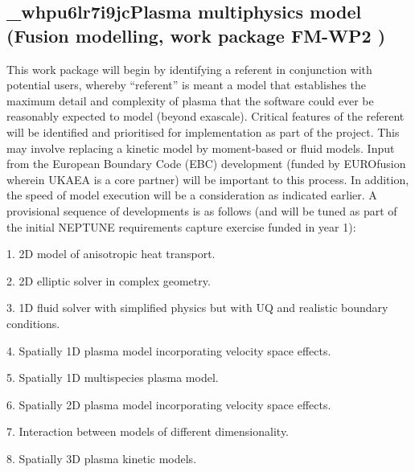 \documentclass{article}
\begin{document}
\vspace{14pt}
\subsection*{{\color{color25} \textbf{\_whpu6lr7i9jcPlasma multiphysics model}}{\color{color25}  
\label{HHlk22033533}(Fusion modelling, work package }{\color{color25} \textbf{FM-WP2}}{\color{color25} )\label{HHlk22044193}}}

\vspace{14pt}
This work package will begin by identifying a referent in conjunction with potential 
users, whereby ``referent'' is meant a model that establishes the maximum detail 
and complexity of plasma that the software could ever be reasonably expected to 
model (beyond exascale).  Critical features of the referent will be identified 
and prioritised for implementation as part of the project. This may involve replacing 
a kinetic model by moment-based or fluid models. Input from the European Boundary 
Code (EBC) development (funded by EUROfusion wherein UKAEA is a core partner) will 
be important to this process. In addition, the speed of model execution will be 
a consideration as indicated earlier. A provisional sequence of developments is 
as follows (and will be tuned as part of the initial NEPTUNE requirements capture 
exercise funded in year 1):

\vspace{14pt}
\leftskip=0pt
1. 2D model of anisotropic heat transport.

\vspace{2pt}
2. 2D elliptic solver in complex geometry.

\vspace{2pt}
3. 1D fluid solver with simplified physics but with UQ and realistic boundary conditions.

\vspace{2pt}
4. Spatially 1D plasma model incorporating velocity space effects.

\vspace{2pt}
5. Spatially 1D multispecies plasma model.

\vspace{2pt}
6. Spatially 2D plasma model incorporating velocity space effects.

\vspace{2pt}
7. Interaction between models of different dimensionality.

\vspace{2pt}
8. Spatially 3D plasma kinetic models.
\end{document}

